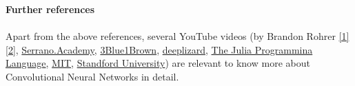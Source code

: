 \documentclass[a4paper,12pt]{book} %
\begin{document}
\titleformat{\section}[block]
{\normalfont\large\bfseries}{\thesection}{1em}{}

\titleformat{\subsection}[block]{\normalfont\normalsize\bfseries}{\thesubsection}{1em}{}

\newpage
\tableofcontents
\newpage

\setlength{\parskip}{0em} %
\setlength{\parindent}{0pt} %












\textbf{Further references}\\\\
Apart from the above references, several YouTube videos (by Brandon Rohrer \href{https://www.youtube.com/watch?v=JB8T_zN7ZC0}{[1]} \href{https://www.youtube.com/watch?v=FmpDIaiMIeA}{[2]}, \href{https://www.youtube.com/watch?v=2-Ol7ZB0MmU}{Serrano.Academy}, \href{https://www.youtube.com/watch?v=KuXjwB4LzSA}{3Blue1Brown}, \href{https://www.youtube.com/watch?v=YRhxdVk_sIs}{deeplizard}, \href{https://www.youtube.com/watch?v=8rrHTtUzyZA}{The Julia Programmina Language}, \href{https://www.youtube.com/watch?v=2xqkSUhmmXU}{MIT}, \href{https://www.youtube.com/playlist?list=PL3FW7Lu3i5JvHM8ljYj-zLfQRF3EO8sYv}{Standford University}) are relevant to know more about Convolutional Neural Networks in detail.
\end{document}
